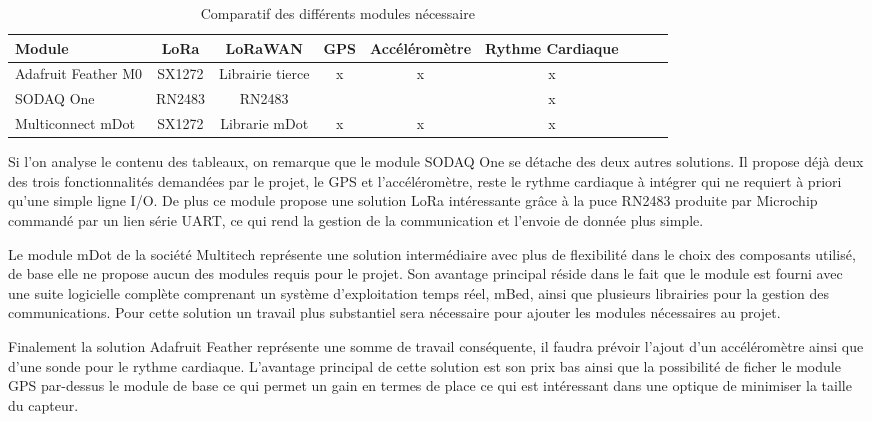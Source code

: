 \begin{table}[htb]
\caption[Comparatif des différents modules nécessaire]{Comparatif des différents modules nécessaire}
\label{tab:comparatif_modules}
\centering
\begin{tabular}{lcccccccc}
\toprule
Module & LoRa & LoRaWAN & GPS & Accéléromètre & Rythme Cardiaque \\ 
\midrule
Adafruit Feather M0	& SX1272	& Librairie tierce & x & x & x  \\
SODAQ One	& RN2483	& RN2483 & \checkmark & \checkmark & x \\
Multiconnect mDot & SX1272 & Librarie mDot & x & x & x \\
\bottomrule 
\end{tabular}
\end{table}

Si l’on analyse le contenu des tableaux, on remarque que le module SODAQ One se détache des deux autres solutions. Il propose déjà deux des trois fonctionnalités demandées par le projet, le GPS et l’accéléromètre, reste le rythme cardiaque à intégrer qui ne requiert à priori qu’une simple ligne I/O. De plus ce module propose une solution LoRa intéressante grâce à la puce RN2483 produite par Microchip commandé par un lien série UART, ce qui rend la gestion de la communication et l’envoie de donnée plus simple.

Le module mDot de la société Multitech représente une solution intermédiaire avec plus de flexibilité dans le choix des composants utilisé, de base elle ne propose aucun des modules requis pour le projet. Son avantage principal réside dans le fait que le module est fourni avec une suite logicielle complète comprenant un système d’exploitation temps réel, mBed, ainsi que plusieurs librairies pour la gestion des communications. Pour cette solution un travail plus substantiel sera nécessaire pour ajouter les modules nécessaires au projet.

Finalement la solution Adafruit Feather représente une somme de travail conséquente, il faudra prévoir l’ajout d’un accéléromètre ainsi que d’une sonde pour le rythme cardiaque. L’avantage principal de cette solution est son prix bas ainsi que la possibilité de ficher le module GPS par-dessus le module de base ce qui permet un gain en termes de place ce qui est intéressant dans une optique de minimiser la taille du capteur.
